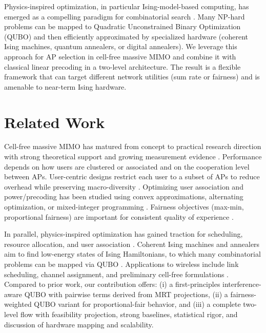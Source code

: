 Physics-inspired optimization, in particular Ising-model-based computing, has emerged as a compelling paradigm for combinatorial search \cite{lucas2014ising,mcmahon2016fully,inagaki2016coherent,kasi2021resource,grassl2022ising}. Many NP-hard problems can be mapped to Quadratic Unconstrained Binary Optimization (QUBO) and then efficiently approximated by specialized hardware (coherent Ising machines, quantum annealers, or digital annealers). We leverage this approach for AP selection in cell-free massive MIMO and combine it with classical linear precoding in a two-level architecture. The result is a flexible framework that can target different network utilities (sum rate or fairness) and is amenable to near-term Ising hardware.

\section{Related Work}


Cell-free massive MIMO has matured from concept to practical research direction with strong theoretical support and growing measurement evidence \cite{ngo2017cell,demir2021foundations,bjornson2019massive}. Performance depends on how users are clustered or associated and on the cooperation level between APs. User-centric designs restrict each user to a subset of APs to reduce overhead while preserving macro-diversity \cite{buzzi2019user,chen2020structured}. Optimizing user association and power/precoding has been studied using convex approximations, alternating optimization, or mixed-integer programming \cite{nayebi2017precoding,bjornson2019making}. Fairness objectives (max-min, proportional fairness) are important for consistent quality of experience \cite{bashar2021max}.

In parallel, physics-inspired optimization has gained traction for scheduling, resource allocation, and user association \cite{kasi2021resource,grassl2022ising}. Coherent Ising machines and annealers aim to find low-energy states of Ising Hamiltonians, to which many combinatorial problems can be mapped via QUBO \cite{lucas2014ising,mcmahon2016fully,inagaki2016coherent,glover2018tutorial}. Applications to wireless include link scheduling, channel assignment, and preliminary cell-free formulations \cite{zhao2022joint}. Compared to prior work, our contribution offers: (i) a first-principles interference-aware QUBO with pairwise terms derived from MRT projections, (ii) a fairness-weighted QUBO variant for proportional-fair behavior, and (iii) a complete two-level flow with feasibility projection, strong baselines, statistical rigor, and discussion of hardware mapping and scalability.

